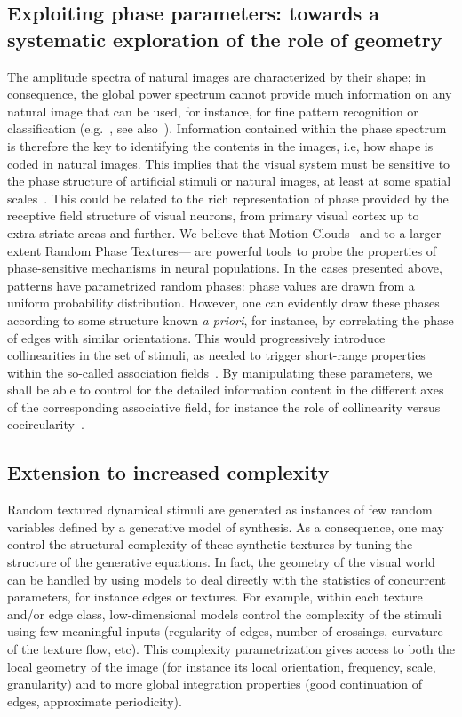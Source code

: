 \documentclass[a4paper,11pt]{article}%
\begin{document}
\subsection{Exploiting phase parameters: towards a systematic exploration of the role of geometry }
The amplitude spectra of natural images are characterized by their  shape; in consequence, the global power spectrum cannot provide much information on any natural image that can be used, for instance, for fine pattern recognition or classification  (e.g.~\citep{VictorComte1996}, see also~\citep{Oliva01,Torralba03}). Information contained within the phase spectrum is therefore the key to {identifying} the contents in the images, i.e, how shape is coded in natural images. This implies that the visual system must be sensitive to the phase structure of artificial stimuli or natural images, at least at some spatial scales~\citep{PhillipsTodd2010,Hansen06}. This could be related to the rich representation of phase provided by the receptive field structure of visual neurons, from primary visual cortex up to extra-striate areas and further. We believe that Motion Clouds --and to a larger extent Random Phase Textures--- are powerful tools to probe the properties of phase-sensitive mechanisms in neural populations. In the cases presented above, patterns have parametrized random phases: phase values are drawn from a uniform probability distribution. However, one can evidently draw these phases according to some structure known \textit{a priori}, for instance, by correlating the phase of edges with similar orientations. This would progressively introduce collinearities in the set of stimuli, as needed to trigger short-range properties within the so-called association fields~\citep{Hess03}. By manipulating these parameters, we shall be able to control for the detailed information content in the different axes of the corresponding associative field, for instance the role of collinearity versus cocircularity~\citep{Perrinet11sfn}. %
%
\subsection{Extension to increased complexity}
Random textured dynamical stimuli are generated as instances of few random variables defined by a generative model of synthesis. As a consequence, one may control the structural complexity of these synthetic textures by tuning the structure of the generative equations. In fact, the geometry of the visual world can be handled by using models to deal directly with the statistics of concurrent parameters, for instance edges or textures. For  example, within each texture and/or edge class, low-dimensional models control the complexity of the stimuli using few meaningful inputs (regularity of edges, number of crossings, curvature of the texture flow, etc). This complexity parametrization gives access to both the local geometry of the image (for instance its local orientation, frequency, scale, granularity) and to more global integration properties (good continuation of edges, approximate periodicity). %
\end{document}
